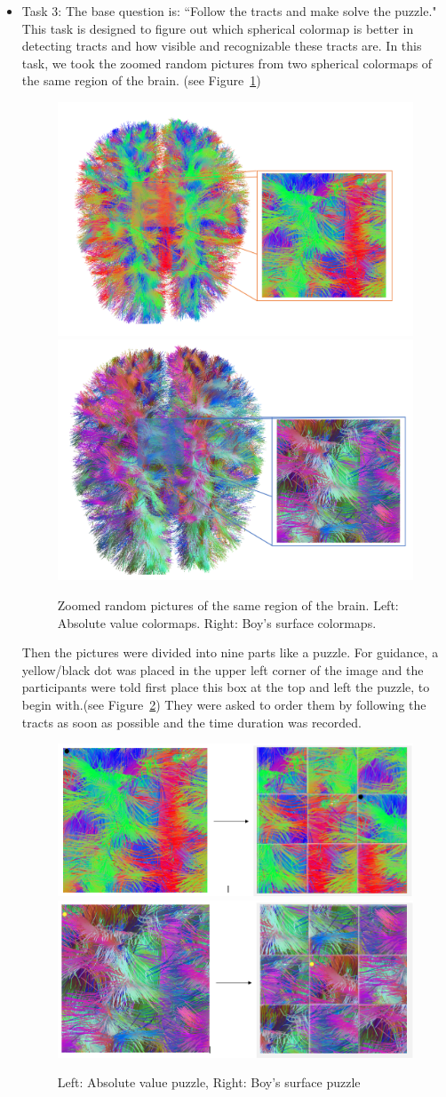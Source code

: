 \documentclass[a4paper, 12pt]{report}
\begin{document}
\begin{itemize}
\item{Task 3:} The base question is: ``Follow the tracts and make solve the puzzle."
This task is designed to figure out which spherical colormap is better in detecting tracts and how visible and recognizable these tracts are. In this task, we took the zoomed random pictures from two spherical colormaps of the same region of the brain. (see Figure~\ref{fig:absolute-zoomed})

\begin{figure}[ht]
    \centering
    \includegraphics[width = 0.49 \columnwidth]{absolute-zoomed}
    \includegraphics[width = 0.45 \columnwidth]{boy's-zoomed}
    \caption{Zoomed random pictures of the same region of the brain. Left:  Absolute value colormaps. Right: Boy's surface colormaps.}
    \label{fig:absolute-zoomed}
\end{figure}

Then the pictures were divided into nine parts like a puzzle. For guidance, a yellow/black dot was placed in the upper left corner of the image and the participants were told first place this box at the top and left the puzzle, to begin with.(see Figure~\ref{fig:absolute-puzzle}) They were asked to order them by following the tracts as soon as possible and the time duration was recorded. 

\begin{figure}[ht]
    \centering
    \includegraphics[width = 0.49 \columnwidth]{absolute-puzzle}
    \includegraphics[width = 0.48 \columnwidth]{boy's-puzzle}
    \caption{ Left:  Absolute value puzzle, Right: Boy's surface puzzle}
    \label{fig:absolute-puzzle}
\end{figure}




\end{itemize}
\end{document}
